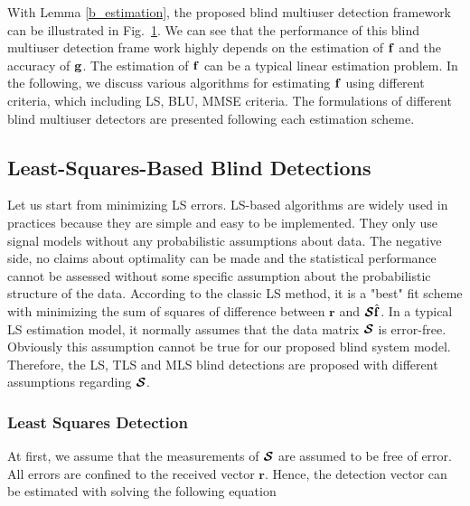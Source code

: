 \documentclass[a4paper,11pt,fleqn]{article}
\newcommand{\br}{{\mathbf r}}
\newcommand{\bg}{{\bf g}}
\newcommand{\bbf}{{\bf f}}
\newcommand{\bcS}{{\mbox {\boldmath ${\cal S}$}}}
\begin{document}
With Lemma \ref{b_estimation}, the proposed blind multiuser
detection framework can be illustrated in Fig.~\ref{MUDstruct}. We
can see that the performance of this blind multiuser detection
frame work highly depends on the estimation of $\bbf$ and the
accuracy of $\bg$. The estimation of $\bbf$ can be a typical
linear estimation problem. In the following, we discuss various
algorithms for estimating $\bbf$ using different criteria, which
including LS, BLU, MMSE criteria. The formulations of different
blind multiuser detectors are presented following each estimation
scheme.
\begin{figure}
\label{MUDstruct}
\end{figure}


\subsection{Least-Squares-Based Blind Detections}
Let us start from minimizing LS errors. LS-based algorithms are
widely used in practices because they are simple and easy to be
implemented. They only use signal models without any probabilistic
assumptions about data. The negative side, no claims about
optimality can be made and the statistical performance cannot be
assessed without some specific assumption about the probabilistic
structure of the data. According to the classic LS method, it is a
"best" fit scheme with minimizing the sum of squares of difference
between $\br$ and $\bcS\hat{\bbf}$. In a typical LS estimation
model, it normally assumes that the data matrix $\bcS$ is
error-free. Obviously this assumption cannot be true for our
proposed blind system model. Therefore, the LS, TLS and MLS blind
detections are proposed with different assumptions regarding
$\bcS$.

\subsubsection{Least Squares Detection }
At first, we assume that the measurements of $\bcS$ are assumed to
be free of error. All errors are confined to the received vector
$\br$. Hence, the detection vector can be estimated with solving
the following equation
\end{document}

